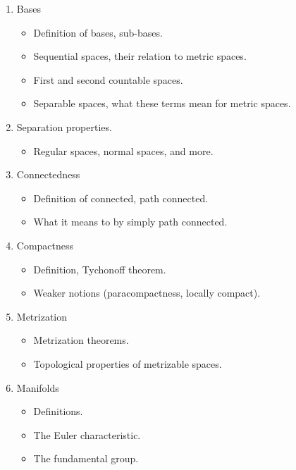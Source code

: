 \documentclass{article}
\begin{document}
\begin{enumerate}
        \item Bases
            \begin{itemize}
                \item Definition of bases, sub-bases.
                \item Sequential spaces, their relation to metric spaces.
                \item First and second countable spaces.
                \item Separable spaces, what these terms mean for metric spaces.
            \end{itemize}
        \item Separation properties.
            \begin{itemize}
                \item Regular spaces, normal spaces, and more.
            \end{itemize}
        \item Connectedness
            \begin{itemize}
                \item Definition of connected, path connected.
                \item What it means to by simply path connected.
            \end{itemize}
        \item Compactness
            \begin{itemize}
                \item Definition, Tychonoff theorem.
                \item Weaker notions (paracompactness, locally compact).
            \end{itemize}
        \item Metrization
            \begin{itemize}
                \item Metrization theorems.
                \item Topological properties of metrizable spaces.
            \end{itemize}
        \item Manifolds
            \begin{itemize}
                \item Definitions.
                \item The Euler characteristic.
                \item The fundamental group.
            \end{itemize}
    \end{enumerate}
\end{document}
